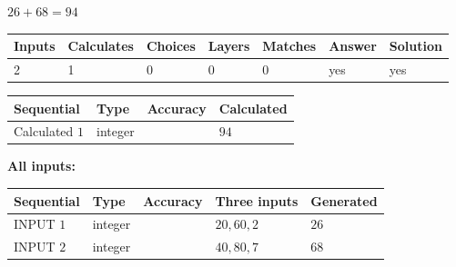 \documentclass[12pt]{article}
\begin{document}
 
\noindent{}
 
 

$ %
26 +  %
68=   %
94$
 
 
\noindent{}
 
 

 
   
   
   
   
\noindent\begin{tabular}{|l|l|l|l|l|l|l|}
 \hline
Inputs & Calculates & Choices & Layers & Matches & Answer & Solution \\ \hline
 2  & 
 1  & 
 0
  & 
 0  & 
 0  & 
  yes & 
  yes 
  \\ \hline
 \end{tabular}
   
   
   
   
\noindent{}
   
   
  
  
\noindent\begin{tabular}{|l|l|l|l|}
\hline
 Sequential & Type & Accuracy & Calculated \\ 
\hline
 
 
  Calculated $  1 $ & integer &  & 
  $ 94 $ 
 \\  \hline  
 \end{tabular}
   
   
   
   
\noindent\vspace{0.1in}\hspace{-0.08in} {\textbf{\Large{All inputs: }}}
   
   
  
  
\noindent\begin{tabular}{|l|l|l|l|l|}
\hline
 Sequential & Type & Accuracy & Three inputs & Generated \\ 
\hline
 
 
  INPUT $  1 $ & integer &  & $
 20
 , 
 60
 , 
 2
 $ & $ 26 $ 
 \\  \hline  
 
 
  INPUT $  2 $ & integer &  & $
 40
 , 
 80
 , 
 7
 $ & $ 68 $ 
 \\  \hline  
 \end{tabular}
   
   
  
\end{document}

